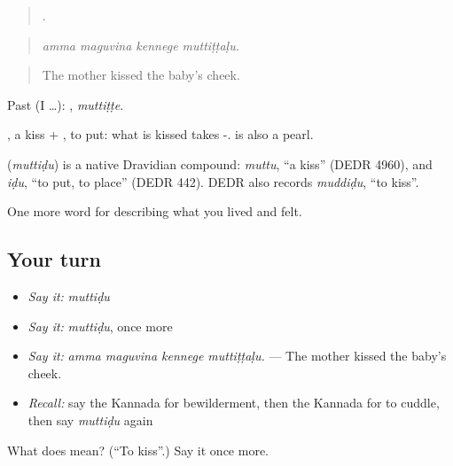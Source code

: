 \begin{quote}
   .
\end{quote}

\begin{quote}
\emph{amma maguvina kennege muttiṭṭaḷu.}
\end{quote}

\begin{quote}
The mother kissed the baby's cheek.
\end{quote}

Past (I …): , \emph{muttiṭṭe}.

, a kiss + , to put: what is kissed takes -.  is also a pearl.

\begin{cousinweb}
\textbf{} (\emph{muttiḍu}) is a native Dravidian compound: \emph{muttu}, \textquotedblleft{}a kiss\textquotedblright{} (DEDR 4960), and \emph{iḍu}, \textquotedblleft{}to put, to place\textquotedblright{} (DEDR 442). DEDR also records \emph{muddiḍu}, \textquotedblleft{}to kiss\textquotedblright{}.
\end{cousinweb}

\begin{grammarlens}[title={What you've built}]
One more word for describing what you lived and felt.
\end{grammarlens}

\subsection*{Your turn}
\begin{itemize}
\raggedright
  \item \emph{Say it:} \emph{muttiḍu}
  \item \emph{Say it:} \emph{muttiḍu}, once more
  \item \emph{Say it:} \emph{amma maguvina kennege muttiṭṭaḷu.} — The mother kissed the baby's cheek.
  \item \emph{Recall:} say the Kannada for bewilderment, then the Kannada for to cuddle, then say \emph{muttiḍu} again
\end{itemize}

\begin{tcolorbox}[breakable,colback=teal!4,colframe=teal!35!black,title={Before you move on}]
What does  mean? (\textquotedblleft{}To kiss\textquotedblright{}.) Say it once more.
\end{tcolorbox}
